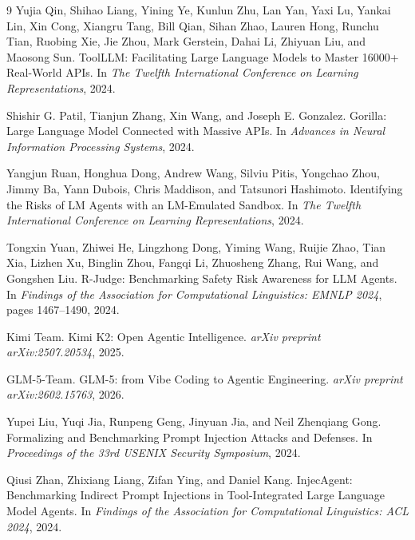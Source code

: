 \documentclass{article}
\begin{document}
{\begin{thebibliography}{9}
Yujia Qin, Shihao Liang, Yining Ye, Kunlun Zhu, Lan Yan, Yaxi Lu, Yankai Lin, Xin Cong, Xiangru Tang, Bill Qian, Sihan Zhao, Lauren Hong, Runchu Tian, Ruobing Xie, Jie Zhou, Mark Gerstein, Dahai Li, Zhiyuan Liu, and Maosong Sun.
\newblock ToolLLM: Facilitating Large Language Models to Master 16000+ Real-World APIs.
\newblock In \emph{The Twelfth International Conference on Learning Representations}, 2024.

Shishir G. Patil, Tianjun Zhang, Xin Wang, and Joseph E. Gonzalez.
\newblock Gorilla: Large Language Model Connected with Massive APIs.
\newblock In \emph{Advances in Neural Information Processing Systems}, 2024.

Yangjun Ruan, Honghua Dong, Andrew Wang, Silviu Pitis, Yongchao Zhou, Jimmy Ba, Yann Dubois, Chris Maddison, and Tatsunori Hashimoto.
\newblock Identifying the Risks of LM Agents with an LM-Emulated Sandbox.
\newblock In \emph{The Twelfth International Conference on Learning Representations}, 2024.

Tongxin Yuan, Zhiwei He, Lingzhong Dong, Yiming Wang, Ruijie Zhao, Tian Xia, Lizhen Xu, Binglin Zhou, Fangqi Li, Zhuosheng Zhang, Rui Wang, and Gongshen Liu.
\newblock R-Judge: Benchmarking Safety Risk Awareness for LLM Agents.
\newblock In \emph{Findings of the Association for Computational Linguistics: EMNLP 2024}, pages 1467--1490, 2024.


Kimi Team.
\newblock Kimi K2: Open Agentic Intelligence.
\newblock \emph{arXiv preprint arXiv:2507.20534}, 2025.

GLM-5-Team.
\newblock GLM-5: from Vibe Coding to Agentic Engineering.
\newblock \emph{arXiv preprint arXiv:2602.15763}, 2026.

Yupei Liu, Yuqi Jia, Runpeng Geng, Jinyuan Jia, and Neil Zhenqiang Gong.
\newblock Formalizing and Benchmarking Prompt Injection Attacks and Defenses.
\newblock In \emph{Proceedings of the 33rd USENIX Security Symposium}, 2024.

Qiusi Zhan, Zhixiang Liang, Zifan Ying, and Daniel Kang.
\newblock InjecAgent: Benchmarking Indirect Prompt Injections in Tool-Integrated Large Language Model Agents.
\newblock In \emph{Findings of the Association for Computational Linguistics: ACL 2024}, 2024.


\end{thebibliography}}
\end{document}
